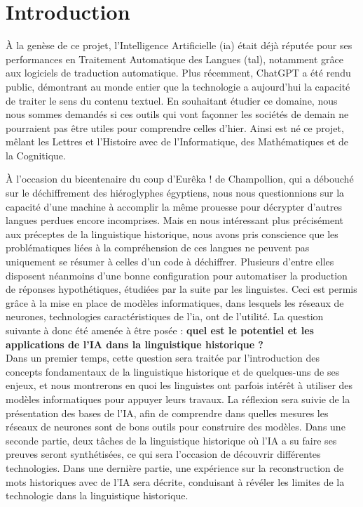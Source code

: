 \documentclass[12pt, twoside]{report}
\begin{document}
\tableofcontents
\listoffigures

\printglossary[title={Vocabulaire et Notations}, toctitle = {Vocabulaire et Notations}]

\chapter{Introduction}

À la genèse de ce projet, l'Intelligence Artificielle (\Gls{ia}) était déjà réputée pour ses performances en Traitement Automatique des Langues (\Gls{tal}), notamment grâce aux logiciels de traduction automatique. Plus récemment, ChatGPT \autocite{chatgpt} a été rendu public, démontrant au monde entier que la technologie a aujourd'hui la capacité de traiter le sens du contenu textuel. En souhaitant étudier ce domaine, nous nous sommes demandés si ces outils qui vont façonner les sociétés de demain ne pourraient pas être utiles pour comprendre celles d’hier. Ainsi est né ce projet, mêlant les Lettres et l'Histoire avec de l'Informatique, des Mathématiques et de la Cognitique.

À l'occasion du bicentenaire du coup d'\og Eurêka !\fg{} de Champollion, qui a débouché sur le déchiffrement des hiéroglyphes égyptiens, nous nous questionnions sur la capacité d'une machine à accomplir la même prouesse pour décrypter d'autres langues perdues encore incomprises. Mais en nous intéressant plus précisément aux préceptes de la linguistique historique, nous avons pris conscience que les problématiques liées à la compréhension de ces langues ne peuvent pas uniquement se résumer à celles d’un code à déchiffrer. Plusieurs d’entre elles disposent néanmoins d’une bonne configuration pour automatiser la production de réponses hypothétiques, étudiées par la suite par les linguistes. Ceci est permis grâce à la mise en place de modèles informatiques, dans lesquels les réseaux de neurones, technologies caractéristiques de l'\Gls{ia}, ont de l'utilité. La question suivante à donc été amenée à être posée : \textbf{quel est le potentiel et les applications de l'IA dans la linguistique historique ?}\\

Dans un premier temps, cette question sera traitée par l’introduction des concepts fondamentaux de la linguistique historique et de quelques-uns de ses enjeux, et nous montrerons en quoi les linguistes ont parfois intérêt à utiliser des modèles informatiques pour appuyer leurs travaux. La réflexion sera suivie de la présentation des bases de l’IA, afin de comprendre dans quelles mesures les réseaux de neurones sont de bons outils pour construire des modèles. 
Dans une seconde partie, deux tâches de la linguistique historique où l’IA a su faire ses preuves seront synthétisées, ce qui sera l’occasion de découvrir différentes technologies.
Dans une dernière partie, une expérience sur la reconstruction de mots historiques avec de l’IA sera décrite, conduisant à révéler les limites de la technologie dans la linguistique historique.
\end{document}
